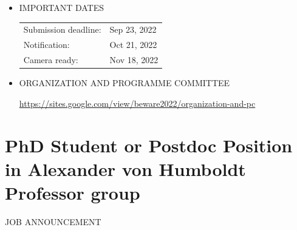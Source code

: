 \documentclass[prodmode,acmtecs]{acmsmall} %
\begin{document}
\begin{itemize}
\item  IMPORTANT DATES  
 
\begin{tabulary}{\linewidth}{LL}Submission deadline:  & Sep 23, 2022 \\
Notification:  & Oct 21, 2022 \\
Camera ready:  & Nov 18, 2022 \\
\end{tabulary}
 
\item  ORGANIZATION AND PROGRAMME COMMITTEE  
 
  \href{https://sites.google.com/view/beware2022/organization-and-pc}{https://sites.google.com/view/beware2022/organization-and-pc}  
 
\end{itemize}\section{PhD Student or Postdoc Position in Alexander von Humboldt Professor group}\label{PhDStudentorPostdocPositioninAlexandervonHumboldtProfessorgroup}JOB ANNOUNCEMENT 
\end{document}
